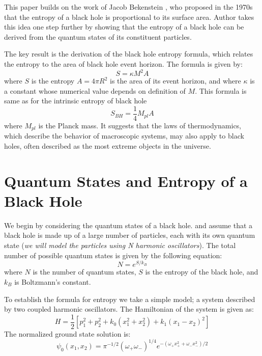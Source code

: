 \documentclass[%
 mph,%
 reprint,%
]{revtex4-2}
\def\op{\omega_+}
\def\om{\omega_-}
\begin{document}
This paper builds on the work of Jacob Bekenstein \cite{PhysRevD.7.2333}, who proposed in the 1970s that the entropy of a black hole is proportional to its surface area. Author takes this idea one step further by showing that the entropy of a black hole can be derived from the quantum states of its constituent particles.

The key result is the derivation of the black hole entropy formula, which relates the entropy  to the area of black hole event horizon. The formula is given by:
\begin{equation}
S = \kappa M^2 A
\end{equation}
where $S$ is the entropy  $A = 4\pi R^2$ is the area of its event horizon, and where \(\kappa 
\) is a constant whose numerical value depends on definition of \(M\). This formula is same as for the intrinsic entropy of black hole
\begin{equation}
    S_{BH} = \frac{1}{4} M_{pl} A
\end{equation}
where \(M_{pl}\) is the Planck mass. 
It suggests that the laws of thermodynamics, which describe the behavior of macroscopic systems, may also apply to black holes, often described as the most extreme objects in the universe.


\section{Quantum States and Entropy of a Black Hole}
We begin by considering the quantum states of a black hole. and assume that a black hole is made up of a large number of particles, each with its own quantum state (\emph{we will model the particles using N harmonic oscillators}). The total number of possible quantum states is given by the following equation:
\begin{equation}
N = e^{S/k_B}
\end{equation}
where $N$ is the number of quantum states, $S$ is the entropy of the black hole, and $k_B$ is Boltzmann's constant.


To establish the formula for entropy we take a simple model; a system described by two coupled harmonic oscillators. The Hamiltonian of the system is given as:
\begin{equation}
    H = \frac{1}{2}\left[p_1^2 + p_2^2 + k_0(x_1^2 + x_2^2)
                               + k_1(x_1-x_2)^2\right]
\end{equation}
The normalized ground state solution is:
\begin{equation}
    \psi_0(x_1,x_2)=\pi^{-1/2}(\op\om)^{1/4}
                   e^{-(\op x_+^2 + \om x_-^2)/2}
\end{equation}
\end{document}
